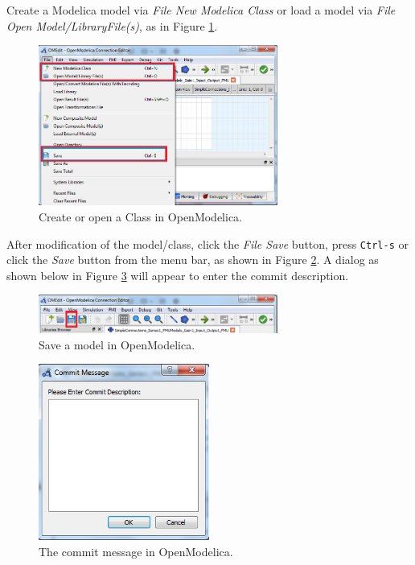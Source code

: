 %
Create a Modelica model via \emph{File \textrightarrow{} New Modelica Class} or load a model via \emph{File \textrightarrow{} Open Model/LibraryFile(s)}, as in Figure \ref{fig:OM_trace_config3}.
%
\begin{figure}[htbp]
\centering
\includegraphics[width=0.7\textwidth]{figures/OM_trace03}
\caption{Create or open a Class in OpenModelica.}
\label{fig:OM_trace_config3}
\end{figure}
%
%
After modification of the model/class, click the \emph{File \textrightarrow{} Save} button, press \texttt{Ctrl-s} or click the \emph{Save} button from the menu bar, as shown in Figure \ref{fig:OM_trace_config4}. A dialog as shown below in Figure \ref{fig:OM_trace_config4b} will appear to enter the commit description.
%
\begin{figure}[htbp]
\centering
\includegraphics[width=0.7\textwidth]{figures/OM_trace04}
\caption{Save a model in OpenModelica.}
\label{fig:OM_trace_config4}
\end{figure}
%
\begin{figure}[htbp]
\centering
\includegraphics[width=0.5\textwidth]{figures/OM_trace04b}
\caption{The commit message in OpenModelica.}
\label{fig:OM_trace_config4b}
\end{figure}
